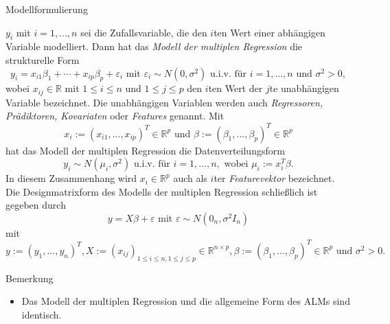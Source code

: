 \documentclass[
  8pt,
  ignorenonframetext,
]{beamer}
\providecommand{\tightlist}{%
  \setlength{\itemsep}{0pt}\setlength{\parskip}{0pt}}
\begin{document}
\begin{frame}{Modellformulierung}
\protect\hypertarget{modellformulierung}{}
\footnotesize
{}
\begin{definition}
\justifying
$y_i$ mit $i = 1,...,n$ sei die Zufallsvariable, die den $i$ten Wert einer abhängigen
Variable modelliert. Dann hat das \textit{Modell der multiplen Regression}
die strukturelle Form \begin{equation}
y_i = x_{i1}\beta_1 + \cdots + x_{ip}\beta_p + \varepsilon_i \mbox{ mit }
\varepsilon_i \sim N(0,\sigma^2) \mbox{ u.i.v. für } i = 1,...,n \mbox{ und } \sigma^2 > 0,
\end{equation}
wobei $x_{ij} \in \mathbb{R}$ mit $1 \le i \le n$ und $1 \le j \le p$ den $i$ten Wert der $j$te
unabhängigen Variable bezeichnet. Die unabhängigen Variablen werden auch
\textit{Regressoren, Prädiktoren, Kovariaten} oder \textit{Features} genannt. Mit
\begin{equation}
x_i := (x_{i1}, ..., x_{ip})^T \in \mathbb{R}^p
\mbox{ und }
\beta := (\beta_1,..., \beta_p)^T \in \mathbb{R}^p
\end{equation}
hat das Modell der multiplen Regression die Datenverteilungsform
\begin{equation}
y_i \sim N(\mu_i,\sigma^2) \mbox{ u.i.v. für } i = 1,...,n, \mbox{ wobei } \mu_i := x^T_i\beta.
\end{equation}
In diesem Zusammenhang wird $x_i \in \mathbb{R}^p$ auch als $i$ter \textit{ Featurevektor } bezeichnet.
Die Designmatrixform des Modells der multiplen Regression schließlich ist gegeben durch
\begin{equation}
y = X\beta + \varepsilon \mbox{ mit } \varepsilon \sim N(0_n,\sigma^2I_n)
\end{equation}
mit
\begin{equation}
y     := (y_1,...,y_n)^T,
X     := (x_{ij})_{1 \le i \le n, 1 \le j \le p} \in \mathbb{R}^{n \times p},
\beta := (\beta_1,...,\beta_p)^T \in \mathbb{R}^p \mbox{ und }
\sigma^2 > 0.
\end{equation}
\end{definition}
\vspace{-2mm}

Bemerkung

\begin{itemize}
\tightlist
\item
  Das Modell der multiplen Regression und die allgemeine Form des ALMs
  sind identisch.
\end{itemize}
\end{frame}
\end{document}
